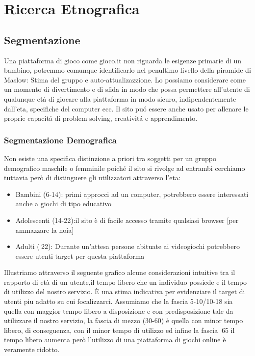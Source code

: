 \documentclass[../Report.tex]{subfiles}
\begin{document}
    \chapter{Ricerca Etnografica}
    \section{Segmentazione}
    Una piattaforma di gioco come gioco.it non riguarda le esigenze primarie di un bambino, potremmo comunque identificarlo nel penultimo livello della piramide di Maslow: Stima del gruppo e auto-attualizazzione.
    Lo possiamo considerare come un momento di divertimento e di sfida in modo che possa permettere all’utente di qualunque etá di giocare alla piattaforma in modo sicuro, indipendentemente dall’eta, specifiche del computer ecc.
    Il sito puó essere anche usato per allenare le proprie capacitá di problem solving, creativitá e apprendimento.

    \subsection{Segmentazione Demografica}
    
    Non esiste una specifica distinzione a priori tra soggetti per un gruppo demografico maschile o femminile poiché il sito si rivolge ad entrambi cerchiamo tuttavia però di distinguere gli utilizzatori attraverso l’eta:
    \begin{itemize}
        \item Bambini (6-14): primi approcci ad un computer, potrebbero essere interessati anche a giochi di tipo educativo
        \item Adolescenti (14-22):il sito è di facile accesso tramite qualsiasi browser [per ammazzare la noia]
        \item Adulti ($\>$22): Durante un’attesa persone abituate ai videogiochi potrebbero essere utenti target per questa piattaforma
    \end{itemize}

    Illustriamo attraverso il seguente grafico alcune considerazioni intuitive tra il rapporto di età di un utente,il tempo libero che un individuo possiede e il tempo di utilizzo del nostro servizio. 
    È una stima indicativa per evidenziare il target di utenti piu adatto su cui focalizzarci.
    Assumiamo che la fascia 5-10/10-18 sia quella con maggior tempo libero a disposizione e con predisposizione tale da utilizzare il nostro servizio, la fascia di mezzo (30-60) è quella con minor tempo libero, di conseguenza, con il minor tempo di utilizzo ed infine la fascia $\>$65 il tempo libero aumenta però l’utilizzo di una piattaforma di giochi online è veramente ridotto. 
\end{document}

